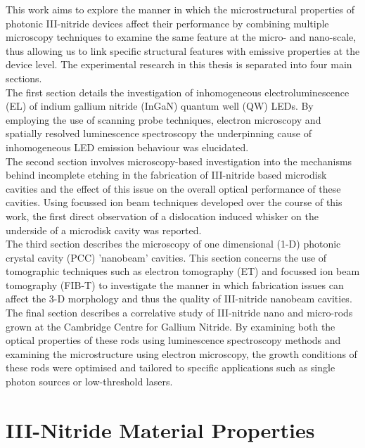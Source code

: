 This work aims to explore the manner in which the microstructural properties of photonic III-nitride devices affect their performance by combining multiple microscopy techniques to examine the same feature at the micro- and nano-scale, thus allowing us to link specific structural features with emissive properties at the device level. The experimental research in this thesis is separated into four main sections. 
\\The first section details the investigation of inhomogeneous electroluminescence  (EL) of indium gallium nitride (InGaN) quantum well (QW) LEDs. By employing the use of scanning probe techniques, electron microscopy and spatially resolved luminescence spectroscopy the underpinning cause of inhomogeneous LED emission behaviour was elucidated.
\\The second section involves microscopy-based investigation into the mechanisms behind incomplete etching in the fabrication of III-nitride based microdisk cavities and the effect of this issue on the overall optical performance of these cavities. Using focussed ion beam techniques developed over the course of this work, the first direct observation of a dislocation induced whisker on the underside of a microdisk cavity was reported.
\\The third section describes the microscopy of one dimensional  (1-D) photonic crystal cavity (PCC) 'nanobeam' cavities. This section concerns the use of tomographic techniques such as electron tomography  (ET) and focussed ion beam tomography  (FIB-T) to investigate the manner in which fabrication issues can affect the 3-D morphology and thus the quality of III-nitride nanobeam cavities.
\\ The final section describes a correlative study of III-nitride nano and micro-rods grown at the Cambridge Centre for Gallium Nitride. By examining both the optical properties of these rods using luminescence spectroscopy methods and examining the microstructure using electron microscopy, the growth conditions of these rods were optimised and tailored to specific applications such as single photon sources or low-threshold lasers.  

\section{III-Nitride Material Properties } %


